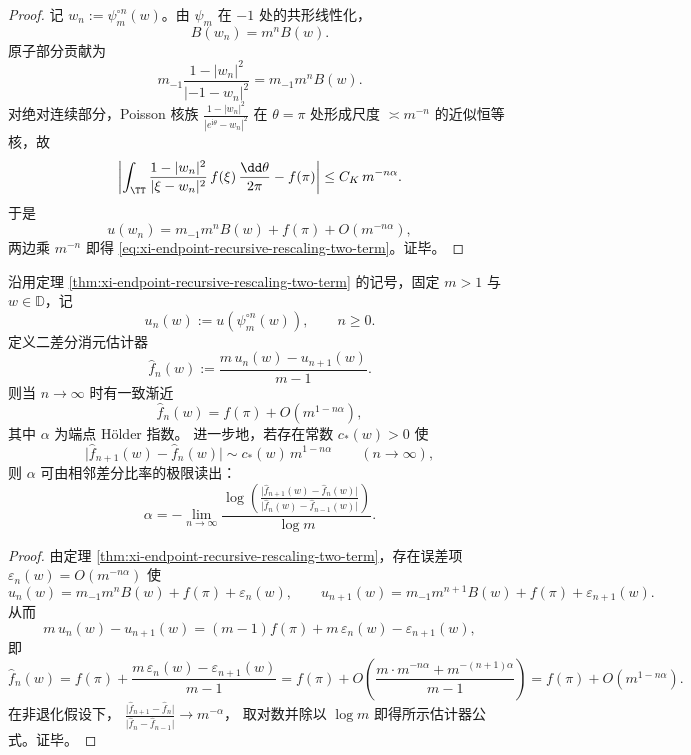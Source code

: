 \begin{proof}
记 \(w_n:=\psi_m^{\circ n}(w)\)。由 \(\psi_m\) 在 \(-1\) 处的共形线性化，
\[
B(w_n)=m^nB(w).
\]
原子部分贡献为
\[
m_{-1}\frac{1-|w_n|^2}{|-1-w_n|^2}=m_{-1}m^nB(w).
\]
对绝对连续部分，Poisson 核族
\(
\frac{1-|w_n|^2}{|e^{\mathrm{i}\theta}-w_n|^2}
\)
在 \(\theta=\pi\) 处形成尺度 \(\asymp m^{-n}\) 的近似恒等核，故
\[
\left|
\int_{\TT}\frac{1-|w_n|^2}{|\xi-w_n|^2}\,f(\xi)\,\frac{\dd\theta}{2\pi}
-f(\pi)\right|
\le C_K\,m^{-n\alpha}.
\]
于是
\[
u(w_n)=m_{-1}m^nB(w)+f(\pi)+O(m^{-n\alpha}),
\]
两边乘 \(m^{-n}\) 即得 \eqref{eq:xi-endpoint-recursive-rescaling-two-term}。证毕。
\end{proof}

\begin{corollary}\label{cor:xi-endpoint-second-difference-elimination-holder-estimator}
沿用定理 \ref{thm:xi-endpoint-recursive-rescaling-two-term} 的记号，固定 \(m>1\) 与 \(w\in\mathbb{D}\)，记
\[
u_n(w):=u\!\left(\psi_m^{\circ n}(w)\right),\qquad n\ge 0.
\]
定义二差分消元估计器
\[
\widehat f_n(w):=\frac{m\,u_n(w)-u_{n+1}(w)}{m-1}.
\]
则当 \(n\to\infty\) 时有一致渐近
\[
\widehat f_n(w)=f(\pi)+O\!\left(m^{1-n\alpha}\right),
\]
其中 \(\alpha\) 为端点 Hölder 指数。
进一步地，若存在常数 \(c_\ast(w)>0\) 使
\[
\bigl|\widehat f_{n+1}(w)-\widehat f_n(w)\bigr|\sim c_\ast(w)\,m^{1-n\alpha}\qquad(n\to\infty),
\]
则 \(\alpha\) 可由相邻差分比率的极限读出：
\[
\alpha
=
-\lim_{n\to\infty}\frac{\log\!\left(\frac{\bigl|\widehat f_{n+1}(w)-\widehat f_n(w)\bigr|}{\bigl|\widehat f_{n}(w)-\widehat f_{n-1}(w)\bigr|}\right)}{\log m}.
\]
\end{corollary}

\begin{proof}
由定理 \ref{thm:xi-endpoint-recursive-rescaling-two-term}，存在误差项 \(\varepsilon_n(w)=O(m^{-n\alpha})\) 使
\[
u_n(w)=m_{-1}m^nB(w)+f(\pi)+\varepsilon_n(w),
\qquad
u_{n+1}(w)=m_{-1}m^{n+1}B(w)+f(\pi)+\varepsilon_{n+1}(w).
\]
从而
\[
m\,u_n(w)-u_{n+1}(w)=(m-1)f(\pi)+m\,\varepsilon_n(w)-\varepsilon_{n+1}(w),
\]
即
\[
\widehat f_n(w)=f(\pi)+\frac{m\,\varepsilon_n(w)-\varepsilon_{n+1}(w)}{m-1}
=f(\pi)+O\!\left(\frac{m\cdot m^{-n\alpha}+m^{-(n+1)\alpha}}{m-1}\right)
=f(\pi)+O\!\left(m^{1-n\alpha}\right).
\]
在非退化假设下，
\(
\frac{\bigl|\widehat f_{n+1}-\widehat f_n\bigr|}{\bigl|\widehat f_{n}-\widehat f_{n-1}\bigr|}\to m^{-\alpha}
\)，
取对数并除以 \(\log m\) 即得所示估计器公式。证毕。
\end{proof}

